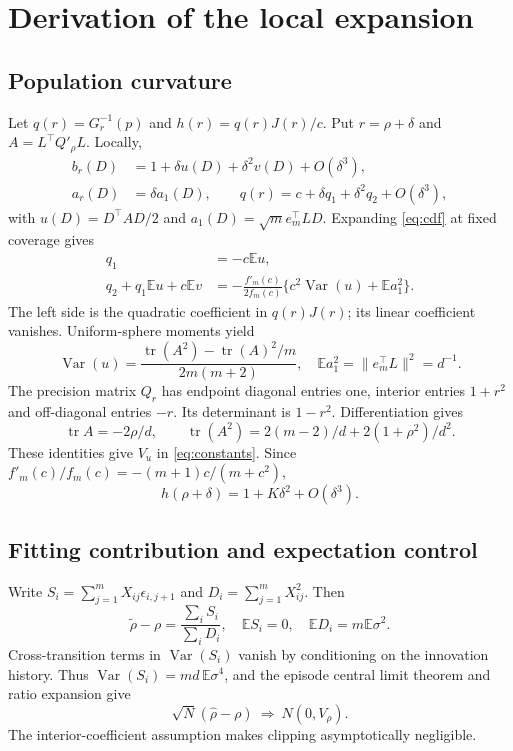 \documentclass[nolineno]{ieeeaccess}
\newcommand{\E}{\mathbb{E}}
\newcommand{\Var}{\operatorname{Var}}
\newcommand{\tr}{\operatorname{tr}}
\begin{document}
\appendices
\section{Derivation of the local expansion}
\subsection{Population curvature}
Let $q(r)=G_r^{-1}(p)$ and $h(r)=q(r)J(r)/c$. Put $r=\rho+\delta$ and $A=L^\top Q'_\rho L$. Locally,
\begin{align}
b_r(D)&=1+\delta u(D)+\delta^2v(D)+O(\delta^3),\nonumber\\
a_r(D)&=\delta a_1(D),\qquad
q(r)=c+\delta q_1+\delta^2q_2+O(\delta^3),
\end{align}
with $u(D)=D^\top AD/2$ and $a_1(D)=\sqrt m e_m^\top LD$. Expanding \eqref{eq:cdf} at fixed coverage gives
\begin{align}
q_1&=-c\E u,\nonumber\\
q_2+q_1\E u+c\E v
&=-\frac{f'_m(c)}{2f_m(c)}
   \{c^2\Var(u)+\E a_1^2\}.
\label{eq:curvature}
\end{align}
The left side is the quadratic coefficient in $q(r)J(r)$; its linear coefficient vanishes. Uniform-sphere moments yield
\begin{equation}
\Var(u)=\frac{\tr(A^2)-\tr(A)^2/m}{2m(m+2)},
\quad \E a_1^2=\|e_m^\top L\|^2=d^{-1}.
\end{equation}
The precision matrix $Q_r$ has endpoint diagonal entries one, interior entries $1+r^2$ and off-diagonal entries $-r$. Its determinant is $1-r^2$. Differentiation gives
\begin{equation}
\tr A=-2\rho/d,\qquad
\tr(A^2)=2(m-2)/d+2(1+\rho^2)/d^2.
\end{equation}
These identities give $V_u$ in \eqref{eq:constants}. Since $f'_m(c)/f_m(c)=-(m+1)c/(m+c^2)$,
\begin{equation}
h(\rho+\delta)=1+K\delta^2+O(\delta^3).
\label{eq:h}
\end{equation}

\subsection{Fitting contribution and expectation control}
Write $S_i=\sum_{j=1}^{m}X_{ij}\epsilon_{i,j+1}$ and $D_i=\sum_{j=1}^{m}X_{ij}^2$. Then
\begin{equation}
\widetilde\rho-\rho=\frac{\sum_iS_i}{\sum_iD_i},
\quad \E S_i=0,\quad \E D_i=m\E\sigma^2.
\end{equation}
Cross-transition terms in $\Var(S_i)$ vanish by conditioning on the innovation history. Thus $\Var(S_i)=md\,\E\sigma^4$, and the episode central limit theorem and ratio expansion give
\begin{equation}
\sqrt N(\widehat\rho-\rho)\ \Longrightarrow\ N(0,V_\rho).
\end{equation}
The interior-coefficient assumption makes clipping asymptotically negligible.
\end{document}
